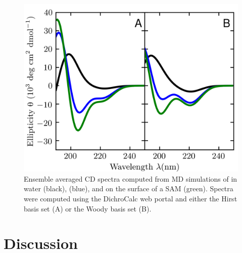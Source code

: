 \begin{figure}
    \center
    \includegraphics[width=\single]{figures-helix/combined_cd_spectra.png}
    \caption[Average computed CD spectra of \pep{}]{
        Ensemble averaged CD spectra computed from MD simulations of \pep{} in water (black), \tbawat{} (blue), and on the surface of a SAM (green). 
        Spectra were computed using the DichroCalc web portal and either the Hirst basis set\cite{Hirst1998, Besley1999} (A) or the Woody basis set\cite{Woody1999} (B).
    }
    \label{fig:helix-avg_cd}
\end{figure}

\section{Discussion}

